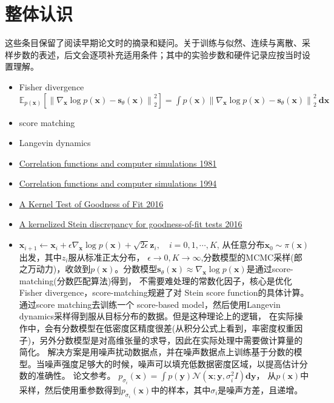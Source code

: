 \section{整体认识}
这些条目保留了阅读早期论文时的摘录和疑问。关于训练与似然、连续与离散、采样步数的表述，后文会逐项补充适用条件；其中的实验步数和硬件记录应按当时设置理解。
\begin{itemize}
  \item  Fisher divergence $\mathbb{E}_{p(\mathbf{x})}\left[\left\|\nabla_{\mathbf{x}} \log p(\mathbf{x})-\mathbf{s}_\theta(\mathbf{x})\right\|_2^2\right]=\int p(\mathbf{x})\left\|\nabla_{\mathbf{x}} \log p(\mathbf{x})-\mathbf{s}_\theta(\mathbf{x})\right\|_2^2 \mathbf{~d} \mathbf{x}$
  \item score matching
  \item  Langevin dynamics
  \item \href{c}{Correlation functions and computer simulations 1981}
  \item \href{c}{Correlation functions and computer simulations 1994}
  \item \href{c}{A Kernel Test of Goodness of Fit 2016}
  \item \href{c}{A kernelized Stein discrepancy for goodness-of-fit tests 2016}
  \item $\mathbf{x}_{i+1} \leftarrow \mathbf{x}_i+\epsilon \nabla_{\mathbf{x}} \log p(\mathbf{x})+\sqrt{2 \epsilon} \mathbf{z}_i, \quad i=0,1, \cdots, K$, 从任意分布$\mathbf{x}_0 \sim \pi(\mathbf{x})$出发，其中$z_i$服从标准正太分布，
  $\epsilon \rightarrow 0, K \rightarrow \infty$,分数模型的MCMC采样(郎之万动力)，收敛到$p(\mathbf{x})$。分数模型$\mathbf{s}_\theta(\mathbf{x}) \approx \nabla_{\mathbf{x}} \log p(\mathbf{x})$是通过score-matching(分数匹配算法)得到，
  不需要难处理的常数化因子，核心是优化Fisher divergence，score-matching规避了对 Stein score function的具体计算。
  通过score matching去训练一个 score-based model，然后使用Langevin dynamics采样得到服从目标分布的数据。但是这种理论上的逻辑，
  在实际操作中，会有分数模型在低密度区精度很差(从积分公式上看到，率密度权重因子)，另外分数模型是对高维张量的求导，因此在实际处理中需要做计算量的简化。
  解决方案是用噪声扰动数据点，并在噪声数据点上训练基于分数的模型。当噪声强度足够大的时候，噪声可以填充低数据密度区域，以提高估计分数的准确性。
  论文参考。
  $p_{\sigma_i}(\mathbf{x})=\int p(\mathbf{y}) \mathcal{N}\left(\mathbf{x} ; \mathbf{y}, \sigma_i^2 I\right) \mathbf{d} \mathbf{y}$，
  从$p(\mathbf{x})$中采样，然后使用重参数得到$p_{\sigma_i}(\mathbf{x})$中的样本，其中$\sigma_i$是噪声方差，且递增。

\end{itemize}

